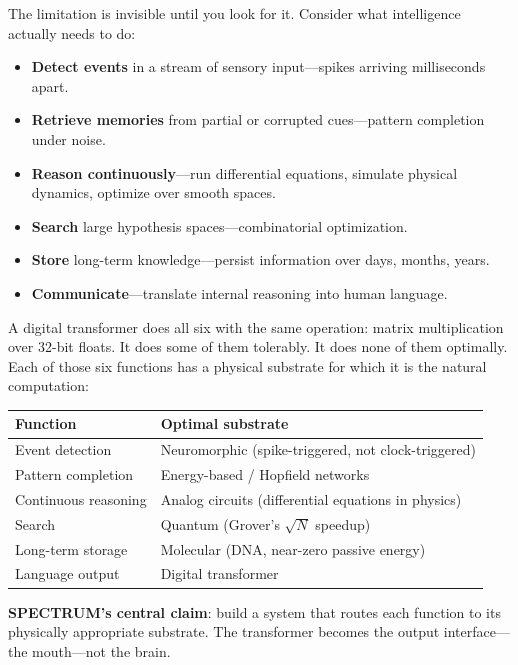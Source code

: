 \documentclass[12pt]{article}
\begin{document}
The limitation is invisible until you look for it. Consider what intelligence actually needs to do:

\begin{itemize}
    \item \textbf{Detect events} in a stream of sensory input---spikes arriving milliseconds apart.
    \item \textbf{Retrieve memories} from partial or corrupted cues---pattern completion under noise.
    \item \textbf{Reason continuously}---run differential equations, simulate physical dynamics, optimize over smooth spaces.
    \item \textbf{Search} large hypothesis spaces---combinatorial optimization.
    \item \textbf{Store} long-term knowledge---persist information over days, months, years.
    \item \textbf{Communicate}---translate internal reasoning into human language.
\end{itemize}

A digital transformer does all six with the same operation: matrix multiplication over 32-bit floats. It does some of them tolerably. It does none of them optimally. Each of those six functions has a physical substrate for which it is the natural computation:

\begin{center}
\small
\begin{tabular}{ll}
\toprule
\textbf{Function} & \textbf{Optimal substrate} \\
\midrule
Event detection & Neuromorphic (spike-triggered, not clock-triggered) \\
Pattern completion & Energy-based / Hopfield networks \\
Continuous reasoning & Analog circuits (differential equations in physics) \\
Search & Quantum (Grover's $\sqrt{N}$ speedup) \\
Long-term storage & Molecular (DNA, near-zero passive energy) \\
Language output & Digital transformer \\
\bottomrule
\end{tabular}
\end{center}

\noindent\textbf{SPECTRUM's central claim}: build a system that routes each function to its physically appropriate substrate. The transformer becomes the output interface---the mouth---not the brain.
\end{document}
